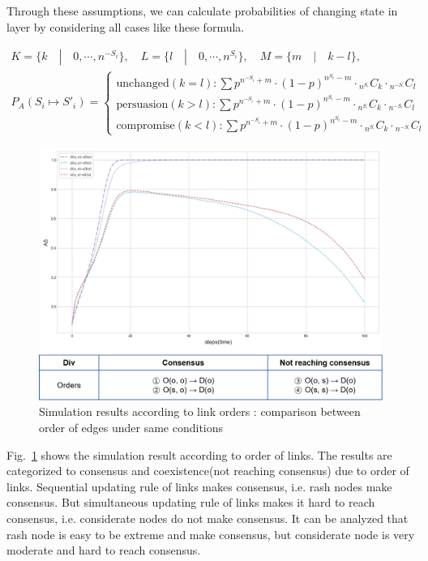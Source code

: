 \documentclass[review]{elsarticle}
\begin{document}
Through these assumptions, we can calculate probabilities of changing state in layer by considering all cases like these formula.  

\begin{equation}
\begin{array}{l}
K = \{ k \quad|\quad 0, \cdots ,{n^{ - {S_i}}}\}, \quad L = \{l \quad|\quad 0, \cdots ,{n^{{S_i}}}\},
\quad M = \{m \quad|\quad k-l\}, \\
{P_A}({S_i} \mapsto {{S'}_i}) = \begin{cases}
\mbox{unchanged}(k = l):\sum {{p^{{n^{ - {S_i}}}+m}} \cdot {{(1 - p)}^{{n^{{S_i}}}-m}} \cdot {}_{{n^{{S_{^i}}}}}{C_k} \cdot {}_{{n^{ - {S_{^i}}}}}{C_l}} \\
\mbox{persuasion}(k > l):\sum {{p^{{n^{ - {S_i}}}+m}} \cdot {{(1 - p)}^{{n^{{S_i}}}-m}} \cdot {}_{{n^{{S_{^i}}}}}{C_k} \cdot {}_{{n^{ - {S_{^i}}}}}{C_l}} \\
\mbox{compromise}(k < l):\sum {{p^{{n^{ - {S_i}}}+m}} \cdot {{(1 - p)}^{{n^{{S_i}}}-m}} \cdot {}_{{n^{{S_{^i}}}}}{C_k} \cdot {}_{{n^{ - {S_{^i}}}}}{C_l}} 
\end{cases}
\end{array}
\end{equation}

\begin{figure}[!htb]
	\centering
	\includegraphics[width=\hsize]{edgeorder.png}
	\caption{Simulation results according to link orders : comparison between order of edges under same conditions}
	\label{edgeorder}
\end{figure}
Fig.~\ref{edgeorder} shows the simulation result according to order of links. The results are categorized to consensus and coexistence(not reaching consensus) due to order of links.
Sequential updating rule of links makes consensus, i.e. rash nodes make consensus. But simultaneous updating rule of links makes it hard to reach consensus, i.e. considerate nodes do not make consensus. It can be analyzed that rash node is easy to be extreme and make consensus, but considerate node is very moderate and hard to reach consensus. 
\end{document}
